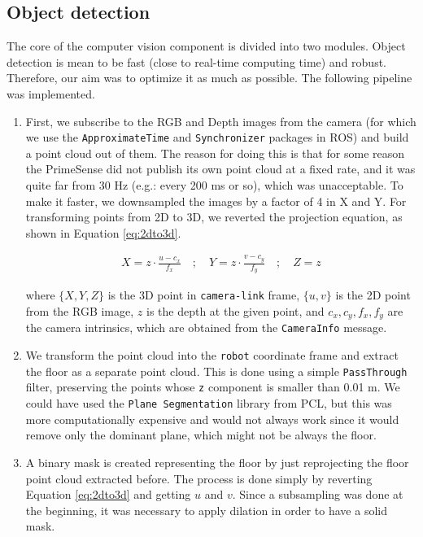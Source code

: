 \subsection{Object detection}
The core of the computer vision component is divided into two modules. Object detection is mean to be fast (close to real-time computing time) and robust. Therefore, our aim was to optimize it as much as possible. The following pipeline was implemented.

\begin{enumerate}
\item First, we subscribe to the RGB and Depth images from the camera (for which we use the \texttt{ApproximateTime} and \texttt{Synchronizer} packages in ROS) and build a point cloud out of them. The reason for doing this is that for some reason the PrimeSense did not publish its own point cloud at a fixed rate, and it was quite far from 30 Hz (e.g.: every 200 ms or so), which was unacceptable. To make it faster, we downsampled the images by a factor of 4 in X and Y. For transforming points from 2D to 3D, we reverted the projection equation, as shown in Equation \ref{eq:2dto3d}.

\begin{align}
\label{eq:2dto3d}
X = z\cdot\frac{u - c_x}{f_x} \quad ; \quad
Y = z\cdot\frac{v - c_y}{f_y} \quad ; \quad 
Z = z
\end{align}

where $\{X,Y,Z\}$ is the 3D point in \texttt{camera-link} frame, $\{u,v\}$ is the 2D point from the RGB image, $z$ is the depth at the given point, and $c_x, c_y, f_x, f_y$ are the camera intrinsics, which are obtained from the \texttt{CameraInfo} message. 

\item We transform the point cloud into the \texttt{robot} coordinate frame and extract the floor as a separate point cloud. This is done using a simple \texttt{PassThrough} filter, preserving the points whose \texttt{z} component is smaller than 0.01 m. We could have used the \texttt{Plane Segmentation} library from PCL, but this was more computationally expensive and would not always work since it would remove only the dominant plane, which might not be always the floor.

\item A binary mask is created representing the floor by just reprojecting the floor point cloud extracted before. The process is done simply by reverting Equation \ref{eq:2dto3d} and getting $u$ and $v$. Since a subsampling was done at the beginning, it was necessary to apply dilation in order to have a solid mask.


\end{enumerate}
